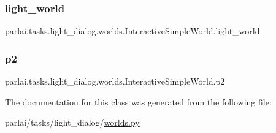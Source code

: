 \subsubsection{\texorpdfstring{light\+\_\+world}{light\_world}}
{\footnotesize\ttfamily parlai.\+tasks.\+light\+\_\+dialog.\+worlds.\+Interactive\+Simple\+World.\+light\+\_\+world}

\mbox{\label{classparlai_1_1tasks_1_1light__dialog_1_1worlds_1_1InteractiveSimpleWorld_a3eff26ccc2fcf05aefd085fcc32337d8}} 
\subsubsection{\texorpdfstring{p2}{p2}}
{\footnotesize\ttfamily parlai.\+tasks.\+light\+\_\+dialog.\+worlds.\+Interactive\+Simple\+World.\+p2}



The documentation for this class was generated from the following file\+:\begin{DoxyCompactItemize}
\item 
parlai/tasks/light\+\_\+dialog/\hyperlink{parlai_2tasks_2light__dialog_2worlds_8py}{worlds.\+py}\end{DoxyCompactItemize}
